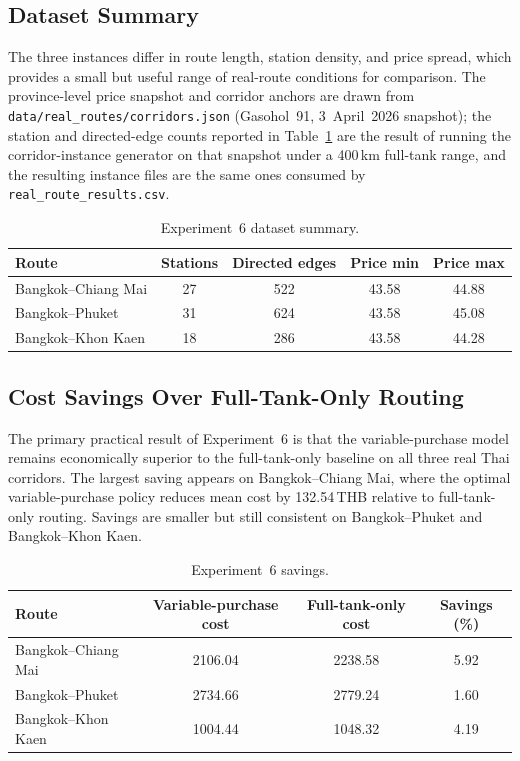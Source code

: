 \subsection*{Dataset Summary}

The three instances differ in route length, station density, and price spread, which provides a
small but useful range of real-route conditions for comparison.
The province-level price snapshot and corridor anchors are drawn from
\texttt{data/real\_routes/corridors.json} (Gasohol~91, 3~April~2026 snapshot); the station
and directed-edge counts reported in Table~\ref{tab:exp6_dataset_summary} are the result of
running the corridor-instance generator on that snapshot under a 400\,km full-tank range,
and the resulting instance files are the same ones consumed by
\texttt{real\_route\_results.csv}.

\begin{table}[H]
    \centering
    \caption{Experiment~6 dataset summary.}
    \label{tab:exp6_dataset_summary}
    \begin{tabular}{lcccc}
        \toprule
        Route & Stations & Directed edges & Price min & Price max \\
        \midrule
        Bangkok--Chiang Mai & 27 & 522 & 43.58 & 44.88 \\
        Bangkok--Phuket & 31 & 624 & 43.58 & 45.08 \\
        Bangkok--Khon Kaen & 18 & 286 & 43.58 & 44.28 \\
        \bottomrule
    \end{tabular}
\end{table}

\subsection*{Cost Savings Over Full-Tank-Only Routing}

The primary practical result of Experiment~6 is that the variable-purchase model remains
economically superior to the full-tank-only baseline on all three real Thai corridors.
The largest saving appears on Bangkok--Chiang Mai, where the optimal variable-purchase policy
reduces mean cost by 132.54\,THB relative to full-tank-only routing.
Savings are smaller but still consistent on Bangkok--Phuket and Bangkok--Khon Kaen.

\begin{table}[H]
    \centering
    \caption{Experiment~6 savings.}
    \label{tab:exp6_savings}
    \begin{tabular}{lccc}
        \toprule
        Route & Variable-purchase cost & Full-tank-only cost & Savings (\%) \\
        \midrule
        Bangkok--Chiang Mai & 2106.04 & 2238.58 & 5.92 \\
        Bangkok--Phuket & 2734.66 & 2779.24 & 1.60 \\
        Bangkok--Khon Kaen & 1004.44 & 1048.32 & 4.19 \\
        \bottomrule
    \end{tabular}
\end{table}


